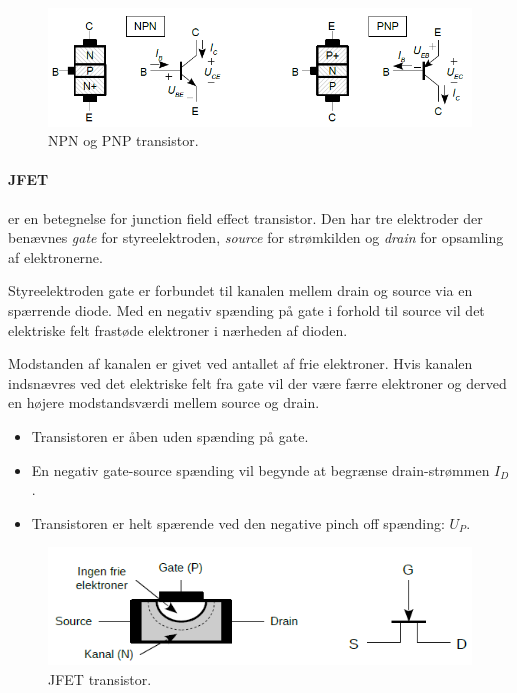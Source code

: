 \documentclass[danish]{article}
\begin{document}
\begin{figure} [H]
	\centering
	\includegraphics[width=\linewidth]{graphics/transistor}
	\caption{NPN og PNP transistor.}
	\label{fig:transistor}
\end{figure}
\newpage
\paragraph{JFET} er en betegnelse for junction field effect transistor. 
Den har tre elektroder der benævnes \textit{gate} for styreelektroden, \textit{source} for strømkilden og \textit{drain} for opsamling af
elektronerne. 

Styreelektroden gate er forbundet til kanalen mellem drain og source via en spærrende diode. 
Med en negativ spænding på gate i forhold til source vil det elektriske felt frastøde elektroner i nærheden af dioden. 

Modstanden af kanalen er givet ved antallet af frie elektroner.
Hvis kanalen indsnævres ved det elektriske felt fra gate vil der være færre elektroner og derved en højere modstandsværdi mellem source og drain.

\begin{itemize}
	\item Transistoren er åben uden spænding på gate.
	\item En negativ gate-source spænding vil begynde at begrænse drain-strømmen $I_D$.
	\item Transistoren er helt spærende ved den negative pinch off spænding: $U_P$.
\end{itemize}

\begin{figure} [H]
	\centering
	\includegraphics[width=\linewidth]{graphics/jfet}
	\caption{JFET transistor.}
	\label{fig:jfet}
\end{figure}
\end{document}
